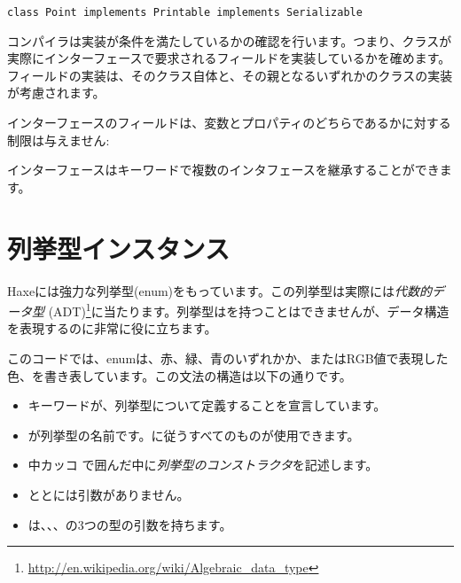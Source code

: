 \begin{lstlisting}
class Point implements Printable implements Serializable
\end{lstlisting}

コンパイラは実装が条件を満たしているかの確認を行います。つまり、クラスが実際にインターフェースで要求されるフィールドを実装しているかを確めます。フィールドの実装は、そのクラス自体と、その親となるいずれかのクラスの実装が考慮されます。

インターフェースのフィールドは、変数とプロパティのどちらであるかに対する制限は与えません:


インターフェースはキーワードで複数のインタフェースを継承することができます。


\section{列挙型インスタンス}
\label{types-enum-instance}

Haxeには強力な列挙型(enum)をもっています。この列挙型は実際には\emph{代数的データ型} (ADT)\footnote{\url{http://en.wikipedia.org/wiki/Algebraic_data_type}}に当たります。列挙型はを持つことはできませんが、データ構造を表現するのに非常に役に立ちます。


このコードでは、enumは、赤、緑、青のいずれかか、またはRGB値で表現した色、を書き表しています。この文法の構造は以下の通りです。

\begin{itemize}
	\item {}キーワードが、列挙型について定義することを宣言しています。
	\item {}が列挙型の名前です。に従うすべてのものが使用できます。
	\item 中カッコ \expr{$\left\{\right\}$} で囲んだ中に\emph{列挙型のコンストラクタ}を記述します。
	\item {}ととには引数がありません。
	\item {}は、、、の3つの型の引数を持ちます。
\end{itemize}

